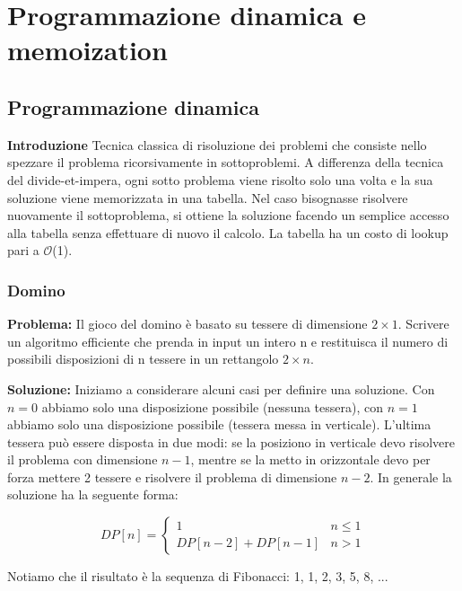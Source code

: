 \documentclass[../cheatSheetAlgoritmi.tex]{subfiles}
\begin{document}
\chapter{Programmazione dinamica e memoization}
\section{Programmazione dinamica}
\textbf{Introduzione} Tecnica classica di risoluzione dei problemi che consiste nello spezzare il problema ricorsivamente in sottoproblemi. A differenza della tecnica del divide-et-impera, ogni sotto problema viene risolto solo una volta e la sua soluzione viene memorizzata in una tabella. Nel caso bisognasse risolvere nuovamente il sottoproblema, si ottiene la soluzione facendo un semplice accesso alla tabella senza effettuare di nuovo il calcolo. La tabella ha un costo di lookup pari a  $\mathcal{O}$(1). 

\subsection{Domino}
\textbf{Problema:} Il gioco del domino è basato su tessere di dimensione $2\times1$. Scrivere un algoritmo efficiente che prenda in input un intero n e restituisca il numero di possibili disposizioni di n tessere in un rettangolo $2\times n$. 

\bigskip

\textbf{Soluzione:} Iniziamo a considerare alcuni casi per definire una soluzione. Con $n=0$ abbiamo solo una disposizione possibile (nessuna tessera), con $n=1$ abbiamo solo una disposizione possibile (tessera messa in verticale). L'ultima tessera può essere disposta in due modi: se la posiziono in verticale devo risolvere il problema con dimensione $n-1$, mentre se la metto in orizzontale devo per forza mettere 2 tessere e risolvere il problema di dimensione $n-2$. In generale la soluzione ha la seguente forma: 

\begin{equation*}
  	DP[n] =\begin{cases}
    	1 & \text{$n \leq 1$}\\
    	DP[n-2] + DP[n-1] & \text{$n > 1$}
  	\end{cases}
\end{equation*}

\bigskip

Notiamo che il risultato è la sequenza di Fibonacci: 1, 1, 2, 3, 5, 8, ... 
\end{document}
